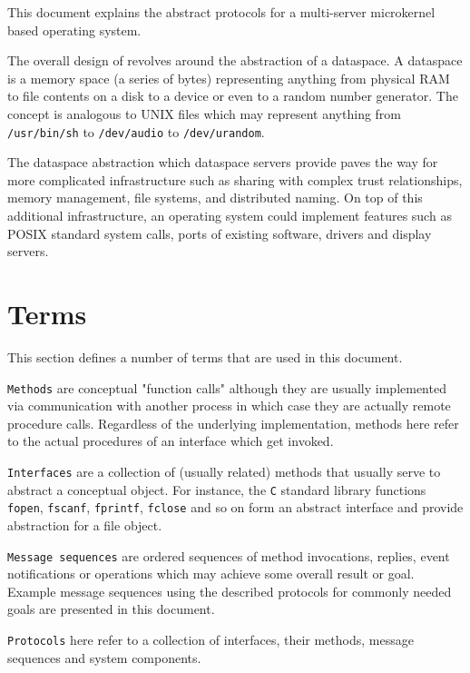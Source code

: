 %
%
%

This document explains the abstract protocols for a multi-server microkernel based operating system.

The overall design of  revolves around the abstraction of a dataspace. A dataspace is a memory space (a series of bytes) representing anything from physical RAM to file contents on a disk to a device or even to a random number generator. The concept is analogous to UNIX files which may represent anything from \texttt{/usr/bin/sh} to \texttt{/dev/audio} to \texttt{/dev/urandom}.

The dataspace abstraction which dataspace servers provide paves the way for more complicated infrastructure such as sharing with complex trust relationships, memory management, file systems, and distributed naming. On top of this additional infrastructure, an operating system could implement features such as POSIX standard system calls, ports of existing software, drivers and display servers.

\section{Terms}

This section defines a number of terms that are used in this document.

\texttt{Methods} are conceptual "function calls" although they are usually implemented via communication with another process in which case they are actually remote procedure calls. Regardless of the underlying implementation, methods here refer to the actual procedures of an interface which get invoked.

\texttt{Interfaces} are a collection of (usually related) methods that usually serve to abstract a conceptual object. For instance, the \texttt{C} standard library functions \texttt{fopen}, \texttt{fscanf}, \texttt{fprintf}, \texttt{fclose} and so on form an abstract interface and provide abstraction for a file object.

\texttt{Message sequences} are ordered sequences of method invocations, replies, event notifications or operations which may achieve some overall result or goal. Example message sequences using the described protocols for commonly needed goals are presented in this document.

\texttt{Protocols} here refer to a collection of interfaces, their methods, message sequences and system components.

